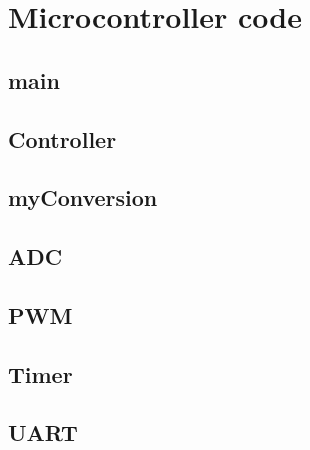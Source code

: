 \section{Microcontroller code}
\subsection{main}


\subsection{Controller}


\subsection{myConversion}


\subsection{ADC}


\subsection{PWM}


\subsection{Timer}


\subsection{UART}



